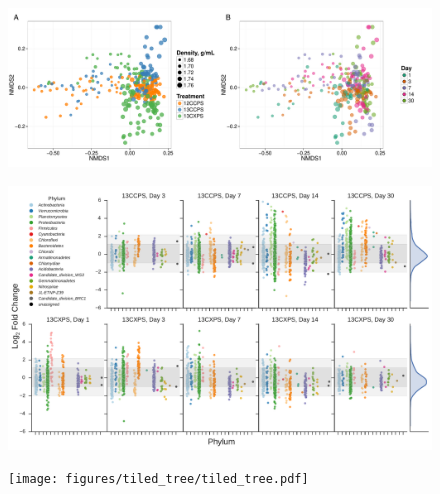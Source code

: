 \thispagestyle{empty}


\begin{figure}[H] \begin{center}
    \centerline{\includegraphics[width=15.4cm]{figures/ordination_all1/ordination_all.pdf}}
    \caption{\protect}\label{fig:ord}
\end{center} \end{figure}


\begin{figure}[H]
	\begin{center}
	\centerline{\includegraphics[width=15.4cm]{figures/l2fc_fig1/l2fc_fig.pdf}}
	\caption{\protect}\label{fig:l2fc}
        \end{center}
\end{figure}

\begin{figure}[H]
	\begin{center}
    \centerline{\texttt{[image: figures/tiled\_tree/tiled\_tree.pdf]}}
    \caption[Phylogenetic trees]{\protect}\label{fig:tiledtree}
    \end{center} 
\end{figure}

